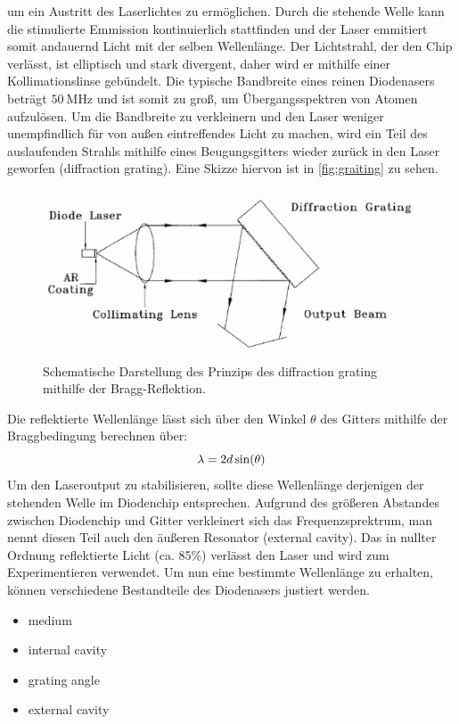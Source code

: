 um ein Austritt des Laserlichtes zu ermöglichen. Durch die stehende Welle kann die stimulierte Emmission kontinuierlich stattfinden
und der Laser emmitiert somit andauernd Licht mit der selben Wellenlänge.
Der Lichtstrahl, der den Chip verlässt, ist elliptisch und stark divergent, daher wird er mithilfe einer Kollimationslinse gebündelt.
Die typische Bandbreite eines reinen Diodenasers beträgt $\qty{50}{\mega\hertz}$ und ist somit zu groß, um Übergangsspektren
von Atomen aufzulösen.
Um die Bandbreite zu verkleinern und den Laser weniger unempfindlich für von außen eintreffendes Licht zu machen, wird ein
Teil des auslaufenden Strahls mithilfe eines Beugungsgitters wieder zurück in den Laser geworfen (diffraction grating).
Eine Skizze hiervon ist in \autoref{fig:graiting} zu sehen.
\begin{figure}[H]
    \centering
    \includegraphics[height=5cm]{content/pics/graiting.png}
    \caption{Schematische Darstellung des Prinzips des diffraction grating mithilfe der Bragg-Reflektion. \cite{V60}}
    \label{fig:graiting}
\end{figure}
Die reflektierte Wellenlänge lässt sich über den Winkel $\theta$ des Gitters mithilfe der Braggbedingung berechnen über:
\begin{equation}
    \notag
    \lambda = 2d \sin(\theta)
\end{equation}
Um den Laseroutput zu stabilisieren, sollte diese Wellenlänge derjenigen der stehenden Welle im Diodenchip entsprechen.
Aufgrund des größeren Abstandes zwischen Diodenchip und Gitter verkleinert sich das Frequenzsprektrum, man nennt diesen Teil
auch den äußeren Resonator (external cavity).
Das in nullter Ordnung reflektierte Licht (ca. 85\%) verlässt den Laser und wird zum Experimentieren verwendet.
Um nun eine bestimmte Wellenlänge zu erhalten, können verschiedene Bestandteile des Diodenasers justiert werden.
\begin{itemize}
    \item medium
    \item internal cavity
    \item grating angle
    \item external cavity
\end{itemize}


